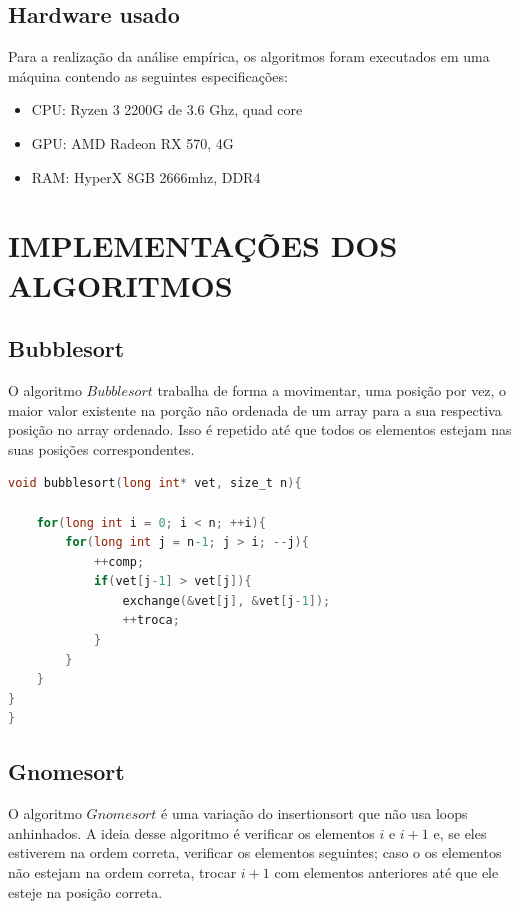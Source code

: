 \documentclass[report]{uftex}
\begin{document}
\section{Hardware usado}
Para a realização da análise empírica, os algoritmos foram executados em uma máquina contendo as seguintes especificações:
\begin{itemize}
    \item CPU: Ryzen 3 2200G de 3.6 Ghz, quad core
    \item GPU: AMD Radeon RX 570, 4G
    \item RAM: HyperX 8GB 2666mhz, DDR4
\end{itemize}


\chapter{IMPLEMENTAÇÕES DOS ALGORITMOS}

\section{Bubblesort}
O algoritmo $Bubblesort$ trabalha de forma a movimentar, uma posição por vez, o maior valor existente na porção não ordenada de um array para a sua respectiva posição no array ordenado. Isso é repetido até que todos os elementos estejam nas suas posições correspondentes.\\

\begin{lstlisting}[language=C]
void bubblesort(long int* vet, size_t n){

    for(long int i = 0; i < n; ++i){
        for(long int j = n-1; j > i; --j){
            ++comp;
            if(vet[j-1] > vet[j]){
                exchange(&vet[j], &vet[j-1]);
                ++troca;
            }
        }
    }
}
}
\end{lstlisting}


\section{Gnomesort}

O algoritmo $Gnomesort$ é uma variação do insertionsort que não usa loops anhinhados. A ideia desse algoritmo é verificar os elementos $i$ e $i+1$ e, se eles estiverem na ordem correta, verificar os elementos seguintes; caso o os elementos não estejam na ordem correta, trocar $i+1$ com elementos anteriores até que ele esteje na posição correta.\\
\end{document}

